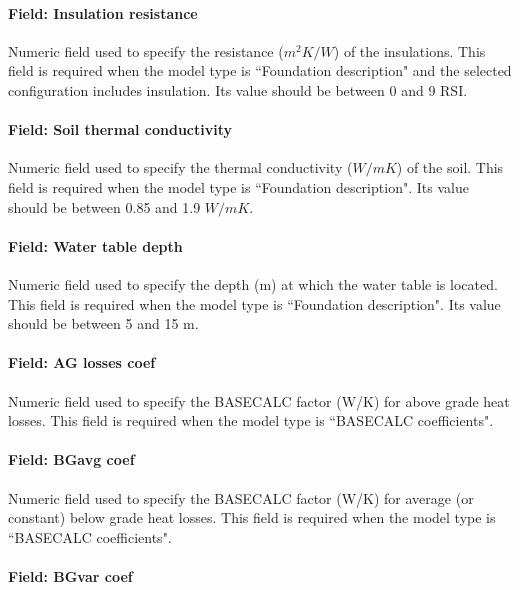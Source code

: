 \paragraph{Field: Insulation resistance}\label{field-insulationresistance-basesimp}

Numeric field used to specify the resistance ($m^2K/W$) of the insulations.  This field is required when the model type is ``Foundation description" and the selected configuration includes insulation.  Its value should be between 0 and 9 RSI.

\paragraph{Field: Soil thermal conductivity}\label{field-soilthermalconductivity-basesimp}

Numeric field used to specify the thermal conductivity ($W/mK$) of the soil.  This field is required when the model type is ``Foundation description".  Its value should be between 0.85 and 1.9 $W/mK$.

\paragraph{Field: Water table depth}\label{field-watertabledepth-basesimp}

Numeric field used to specify the depth (m) at which the water table is located.  This field is required when the model type is ``Foundation description".  Its value should be between 5 and 15 m.

\paragraph{Field: AG losses coef}\label{field-agcoeff-basesimp}

Numeric field used to specify the BASECALC factor (W/K) for above grade heat losses.  This field is required when the model type is ``BASECALC coefficients".

\paragraph{Field: BGavg coef}\label{field-bgavgcoeff-basesimp}

Numeric field used to specify the BASECALC factor (W/K) for average (or constant) below grade heat losses.  This field is required when the model type is ``BASECALC coefficients".

\paragraph{Field: BGvar coef}\label{field-bgvarcoeff-basesimp}

